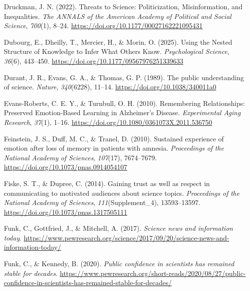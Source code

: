 \documentclass[
  jou,
  floatsintext,
  longtable,
  nolmodern,
  notxfonts,
  notimes,
  colorlinks=true,linkcolor=blue,citecolor=blue,urlcolor=blue]{apa7}
\newlength{\cslhangindent}
\newenvironment{CSLReferences}[2] %
 {\begin{list}{}{%
  \setlength{\itemindent}{0pt}
  \setlength{\leftmargin}{0pt}
  \setlength{\parsep}{0pt}
  \ifodd #1
   \setlength{\leftmargin}{\cslhangindent}
   \setlength{\itemindent}{-1\cslhangindent}
  \fi
  \setlength{\itemsep}{#2\baselineskip}}}
 {\end{list}}
\begin{document}
\begin{CSLReferences}{1}{0}
Druckman, J. N. (2022). Threats to Science: Politicization,
Misinformation, and Inequalities. \emph{The ANNALS of the American
Academy of Political and Social Science}, \emph{700}(1), 8--24.
\url{https://doi.org/10.1177/00027162221095431}

Dubourg, E., Dheilly, T., Mercier, H., \& Morin, O. (2025). Using the
Nested Structure of Knowledge to Infer What Others Know.
\emph{Psychological Science}, \emph{36}(6), 443--450.
\url{https://doi.org/10.1177/09567976251339633}

Durant, J. R., Evans, G. A., \& Thomas, G. P. (1989). The public
understanding of science. \emph{Nature}, \emph{340}(6228), 11--14.
\url{https://doi.org/10.1038/340011a0}

Evans-Roberts, C. E. Y., \& Turnbull, O. H. (2010). Remembering
Relationships: Preserved Emotion-Based Learning in Alzheimer's Disease.
\emph{Experimental Aging Research}, \emph{37}(1), 1--16.
\url{https://doi.org/10.1080/0361073X.2011.536750}

Feinstein, J. S., Duff, M. C., \& Tranel, D. (2010). Sustained
experience of emotion after loss of memory in patients with amnesia.
\emph{Proceedings of the National Academy of Sciences}, \emph{107}(17),
7674--7679. \url{https://doi.org/10.1073/pnas.0914054107}

Fiske, S. T., \& Dupree, C. (2014). Gaining trust as well as respect in
communicating to motivated audiences about science topics.
\emph{Proceedings of the National Academy of Sciences},
\emph{111}(Supplement{\_}4), 13593--13597.
\url{https://doi.org/10.1073/pnas.1317505111}

Funk, C., Gottfried, J., \& Mitchell, A. (2017). \emph{Science news and
information today}.
\url{https://www.pewresearch.org/science/2017/09/20/science-news-and-information-today/}

Funk, C., \& Kennedy, B. (2020). \emph{Public confidence in scientists
has remained stable for decades}.
\url{https://www.pewresearch.org/short-reads/2020/08/27/public-confidence-in-scientists-has-remained-stable-for-decades/}


\end{CSLReferences}
\end{document}
